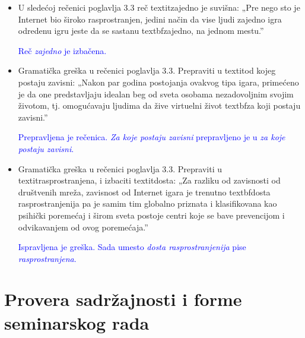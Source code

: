 \documentclass[a4paper]{report}
\newcommand{\odgovor}[1]{\textcolor{blue}{#1}}
\begin{document}
\begin{itemize}
    \item U sledećoj rečenici poglavlja 3.3 reč textit{zajedno} je suvišna: \newline
    „Pre nego sto je Internet bio široko rasprostranjen, jedini način da vise ljudi zajedno igra odredenu igru jeste da se sastanu textbf{zajedno}, na jednom mestu.”
    
    \odgovor{Reč \textit{zajedno} je izbačena.}
    
    
\end{itemize}
\begin{itemize}
    \item Gramatička greška u rečenici poglavlja 3.3. Prepraviti u textit{od kojeg postaju zavisni}:
    \newline
    „Nakon par godina postojanja ovakvog tipa igara, primećeno je da one predstavljaju idealan beg od sveta osobama nezadovoljnim svojim životom, tj. omogućavaju ljudima da žive virtuelni život textbf{za koji postaju zavisni}.”
    
    \odgovor{Prepravljena je rečenica. \textit{Za koje postaju zavisni} prepravljeno je u \textit{za koje postaju zavisni}.}
    
\end{itemize}
\begin{itemize}
    \item Gramatička greška u rečenici poglavlja 3.3. Prepraviti u textit{rasprostranjena}, i izbaciti textit{dosta}:
    \newline
    „Za razliku od zavisnosti od društvenih mreža, zavisnost od Internet igara je trenutno textbf{dosta rasprostranjenija} pa je samim tim globalno priznata i klasifikovana kao psihički poremećaj i širom sveta postoje centri koje se bave prevencijom i odvikavanjem od ovog poremećaja.”
    
    \odgovor{Ispravljena je greška. Sada umesto \textit{dosta rasprostranjenija} pise \textit{rasprostranjena}.}
    
    
\end{itemize}
\section{Provera sadržajnosti i forme seminarskog rada}
\end{document}
